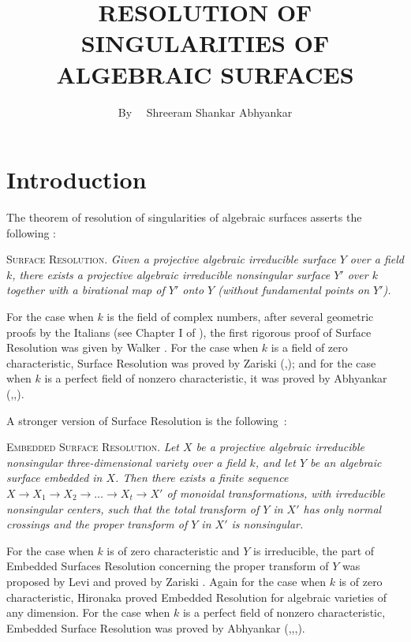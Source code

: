 \title{RESOLUTION OF SINGULARITIES OF ALGEBRAIC SURFACES}

\author{By~~ Shreeram Shankar Abhyankar}

\date{}

\maketitle

\setcounter{pageoriginal}{0}
\section{Introduction}\label{art01-sec1}
\pageoriginale 

The theorem of resolution of singularities of algebraic surfaces asserts the following :

\textsc{Surface Resolution.} {\em Given a projective algebraic irreducible surface $Y$ over a field $k$, there exists a projective algebraic irreducible nonsingular surface $Y'$ over $k$ together with a birational map of $Y'$ onto $Y$ (without fundamental points on $Y'$).}

For the case when $k$ is the field of complex numbers, after several geometric proofs by the Italians (see Chapter I of \cite{art01-key15}), the first rigorous proof of Surface Resolution was given by Walker \cite{art01-key14}. For the case when $k$ is a field of zero characteristic, Surface Resolution was proved by Zariski (\cite{art01-key16},\cite{art01-key17}); and for the case when $k$ is a perfect field of nonzero characteristic, it was proved by Abhyankar (\cite{art01-key2},\cite{art01-key3},\cite{art01-key4}).

A stronger version of Surface Resolution is the following~:

\medskip
\textsc{Embedded Surface Resolution.} {\em Let $X$ be a projective algebraic irreducible nonsingular three-dimensional variety over a field $k$, and let $Y$ be an algebraic surface embedded in $X$. Then there exists a finite sequence $X\to X_{1}\to X_{2}\to \ldots\to X_{t}\to X'$ of monoidal transformations, with irreducible nonsingular centers, such that the total transform of $Y$ in $X'$ has only normal crossings and the proper transform of $Y$ in $X'$ is nonsingular.}

For the case when $k$ is of zero characteristic and $Y$ is irreducible, the part of Embedded Surfaces Resolution concerning the proper transform of $Y$ was proposed by Levi \cite{art01-key13} and proved by Zariski \cite{art01-key18}. Again for the case when $k$ is of zero characteristic, Hironaka \cite{art01-key12} proved Embedded Resolution for algebraic varieties of any dimension. For the case when $k$ is a perfect field of nonzero characteristic, Embedded Surface Resolution was proved by Abhyankar (\cite{art01-key7},\cite{art01-key9},\cite{art01-key10},\cite{art01-key11}).


